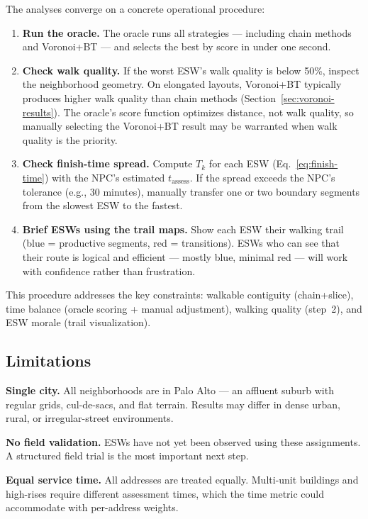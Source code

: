 \documentclass[conference]{IEEEtran}
\begin{document}
The analyses converge on a concrete operational procedure:

\begin{enumerate}
\item \textbf{Run the oracle.} The oracle runs all strategies --- including chain methods and Voronoi+BT --- and selects the best by score in under one second.

\item \textbf{Check walk quality.} If the worst ESW's walk quality is below 50\%, inspect the neighborhood geometry. On elongated layouts, Voronoi+BT typically produces higher walk quality than chain methods (Section~\ref{sec:voronoi-results}). The oracle's score function optimizes distance, not walk quality, so manually selecting the Voronoi+BT result may be warranted when walk quality is the priority.

\item \textbf{Check finish-time spread.} Compute $T_k$ for each ESW (Eq.~\ref{eq:finish-time}) with the NPC's estimated $t_{\text{assess}}$. If the spread exceeds the NPC's tolerance (e.g., 30 minutes), manually transfer one or two boundary segments from the slowest ESW to the fastest.

\item \textbf{Brief ESWs using the trail maps.} Show each ESW their walking trail (blue = productive segments, red = transitions). ESWs who can see that their route is logical and efficient --- mostly blue, minimal red --- will work with confidence rather than frustration.
\end{enumerate}

This procedure addresses the key constraints: walkable contiguity (chain+slice), time balance (oracle scoring + manual adjustment), walking quality (step~2), and ESW morale (trail visualization).

\subsection{Limitations}

\textbf{Single city.} All neighborhoods are in Palo Alto --- an affluent suburb with regular grids, cul-de-sacs, and flat terrain. Results may differ in dense urban, rural, or irregular-street environments.

\textbf{No field validation.} ESWs have not yet been observed using these assignments. A structured field trial is the most important next step.

\textbf{Equal service time.} All addresses are treated equally. Multi-unit buildings and high-rises require different assessment times, which the time metric could accommodate with per-address weights.
\end{document}

